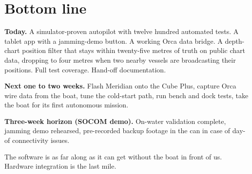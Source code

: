 \documentclass[10pt,a4paper]{article}
\begin{document}
\section{Bottom line}
\begin{tcolorbox}[colframe=mSafe, colback=white, title=\normalsize Today / next two weeks / three-week horizon]
\textbf{Today.} A simulator-proven autopilot with twelve hundred
automated tests. A tablet app with a jamming-demo button. A working
Orca data bridge. A depth-chart position filter that stays within
twenty-five metres of truth on public chart data, dropping to four
metres when two nearby vessels are broadcasting their positions. Full
test coverage. Hand-off documentation.

\textbf{Next one to two weeks.} Flash Meridian onto the Cube Plus,
capture Orca wire data from the boat, tune the cold-start path, run
bench and dock tests, take the boat for its first autonomous mission.

\textbf{Three-week horizon (SOCOM demo).} On-water validation
complete, jamming demo rehearsed, pre-recorded backup footage in the
can in case of day-of connectivity issues.

The software is as far along as it can get without the boat in front
of us. Hardware integration is the last mile.
\end{tcolorbox}
\end{document}

